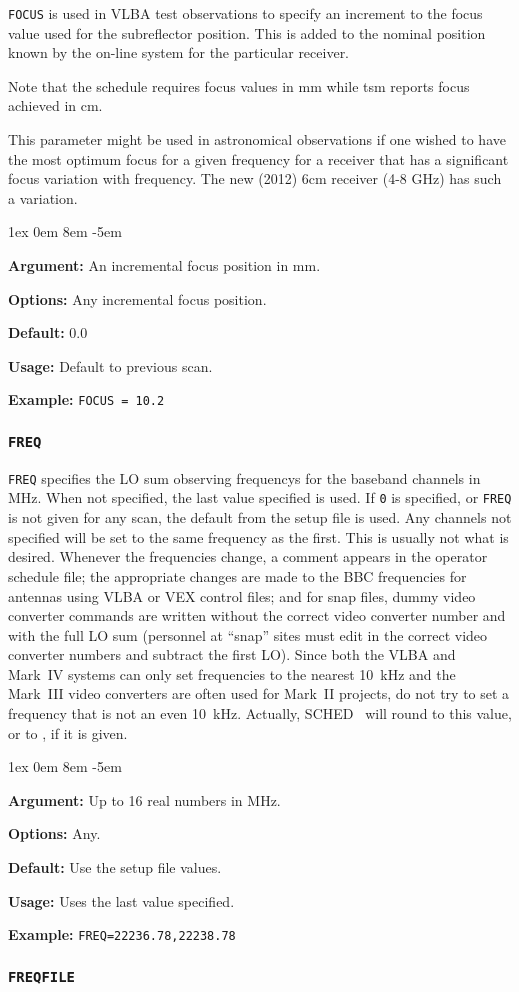 \documentclass{report}
\newcommand{\schedb}{{\sc SCHED~}}
\newcommand{\rcwbox}[5]{
  \begin{list}{}{\parsep 1ex  \itemsep 0em
                 \leftmargin 8em  \itemindent -5em }
    \item {\bf Argument:} #1
    \item {\bf Options:}  #2
    \item {\bf Default:}  #3
    \item {\bf Usage:}    #4
    \item {\bf Example:}  #5
  \end{list}
}
\begin{document}
{\tt FOCUS} is used in VLBA test observations to specify an
increment to the focus value used for the subreflector position.
This is added to the nominal position known by the on-line system
for the particular receiver.

Note that the schedule requires focus values in mm while tsm
reports focus achieved in cm.

This parameter might be used in astronomical observations if one
wished to have the most optimum focus for a given frequency for a
receiver that has a significant focus variation with frequency.  The
new (2012) 6cm receiver (4-8 GHz) has such a variation.

\rcwbox
{An incremental focus position in mm.}
{Any incremental focus position.}
{0.0}
{Default to previous scan.}
{{\tt FOCUS = 10.2 }}

\subsubsection{\label{MP:FREQ}{\tt FREQ}}

{\tt FREQ} specifies the LO sum observing frequencys for the baseband
channels in MHz.  When not specified, the last value specified is
used. If {\tt 0} is specified, or {\tt FREQ} is not given for any
scan, the default from the setup file is used.  Any channels not
specified will be set to the same frequency as the first.  This is
usually not what is desired.  Whenever the frequencies change, a
comment appears in the operator schedule file; the appropriate changes
are made to the BBC frequencies for antennas using VLBA or VEX control
files; and for snap files, dummy video converter commands are written
without the correct video converter number and with the full LO sum
(personnel at ``snap'' sites must edit in the correct video converter
numbers and subtract the first LO). Since both the VLBA and Mark~IV
systems can only set frequencies to the nearest 10~kHz and the
Mark~III video converters are often used for Mark~II projects, do not
try to set a frequency that is not an even 10~kHz.  Actually, \schedb
will round to this value, or to ,
if it is given.


\rcwbox
{Up to 16 real numbers in MHz.}
{Any.}
{Use the setup file values.}
{Uses the last value specified.}
{{\tt FREQ=22236.78,22238.78}}


\subsubsection{\label{MP:FREQFILE}{\tt FREQFILE}}
\end{document}
